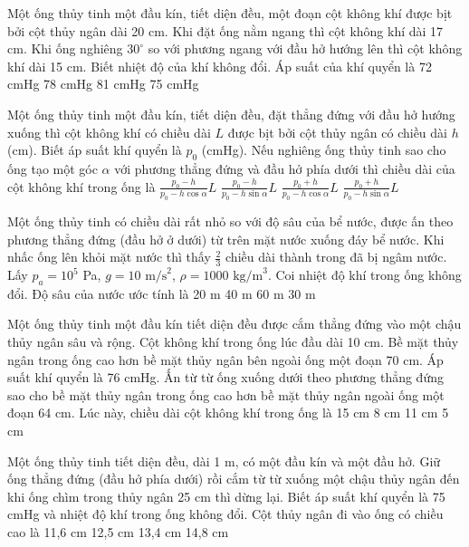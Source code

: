 \begin{ex}
Một ống thủy tinh một đầu kín, tiết diện đều, một đoạn cột không khí được bịt bởi cột thủy ngân dài 20 cm. Khi đặt ống nằm ngang thì cột không khí dài 17 cm. Khi ống nghiêng $30^\circ$ so với phương ngang với đầu hở hướng lên thì cột không khí dài 15 cm. Biết nhiệt độ của khí không đổi. Áp suất của khí quyển là
\choice
{72 cmHg}
{78 cmHg}
{81 cmHg}
{75 cmHg}
\end{ex}

\begin{ex}
Một ống thủy tinh một đầu kín, tiết diện đều, đặt thẳng đứng với đầu hở hướng xuống thì cột không khí có chiều dài $L$ được bịt bởi cột thủy ngân có chiều dài $h$ (cm). Biết áp suất khí quyển là $p_0$ (cmHg). Nếu nghiêng ống thủy tinh sao cho ống tạo một góc $\alpha$ với phương thẳng đứng và đầu hở phía dưới thì chiều dài của cột không khí trong ống là
\choice
{$\frac{p_0-h}{p_0-h\cos\alpha}L$}
{$\frac{p_0-h}{p_0-h\sin\alpha}L$}
{$\frac{p_0+h}{p_0-h\cos\alpha}L$}
{$\frac{p_0+h}{p_0-h\sin\alpha}L$}
\end{ex}

\begin{ex}
Một ống thủy tinh có chiều dài rất nhỏ so với độ sâu của bể nước, được ấn theo phương thẳng đứng (đầu hở ở dưới) từ trên mặt nước xuống đáy bể nước. Khi nhấc ống lên khỏi mặt nước thì thấy $\frac{2}{3}$ chiều dài thành trong đã bị ngâm nước. Lấy $p_a = 10^5$ Pa, $g=10 \text{ m/s}^2$, $\rho = 1000 \text{ kg/m}^3$. Coi nhiệt độ khí trong ống không đổi. Độ sâu của nước ước tính là
\choice
{20 m}
{40 m}
{60 m}
{30 m}
\end{ex}

\begin{ex}
Một ống thủy tinh một đầu kín tiết diện đều được cắm thẳng đứng vào một chậu thủy ngân sâu và rộng. Cột không khí trong ống lúc đầu dài 10 cm. Bề mặt thủy ngân trong ống cao hơn bề mặt thủy ngân bên ngoài ống một đoạn 70 cm. Áp suất khí quyển là 76 cmHg. Ấn từ từ ống xuống dưới theo phương thẳng đứng sao cho bề mặt thủy ngân trong ống cao hơn bề mặt thủy ngân ngoài ống một đoạn 64 cm. Lúc này, chiều dài cột không khí trong ống là
\choice
{15 cm}
{8 cm}
{11 cm}
{5 cm}
\end{ex}

\begin{ex}
Một ống thủy tinh tiết diện đều, dài 1 m, có một đầu kín và một đầu hở. Giữ ống thẳng đứng (đầu hở phía dưới) rồi cắm từ từ xuống một chậu thủy ngân đến khi ống chìm trong thủy ngân 25 cm thì dừng lại. Biết áp suất khí quyển là 75 cmHg và nhiệt độ khí trong ống không đổi. Cột thủy ngân đi vào ống có chiều cao là
\choice
{11,6 cm}
{12,5 cm}
{13,4 cm}
{14,8 cm}
\end{ex}

